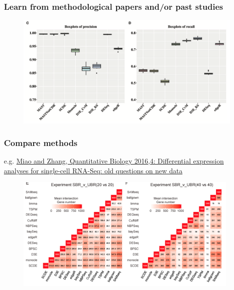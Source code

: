 \documentclass{beamer}\usepackage[]{graphicx}\usepackage[]{color}
\begin{document}
\begin{frame}
\frametitle{Learn from methodological papers and/or past studies}
\begin{center}
\begin{figure}
\includegraphics[width=12cm]{Images/DalMolin_fig2cd.png}
\end{figure}
\end{center}
\end{frame}

\begin{frame}
\frametitle{Compare methods}
e.g. \href{Differential expression analyses for single-cell RNA-Seq: old questions on n???}{Miao and Zhang, Quantitative Biology 2016,4: Differential expression analyses for single-cell RNA-Seq: old questions on new data}
\begin{center}
\begin{figure}
\includegraphics[width=11cm]{Images/Miao_fig1ef.png}
\end{figure}
\end{center}
\end{frame}
\end{document}
